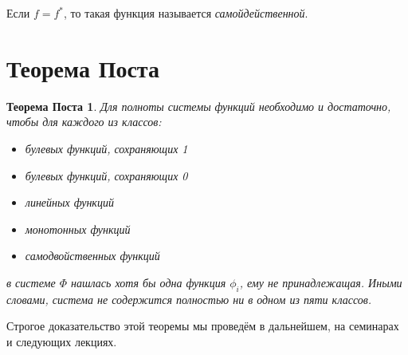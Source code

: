 ﻿\documentclass[a4paper, 12pt]{article}
\newtheorem*{poste}{Теорема Поста}
\begin{document}
Если $f = f^*$, то такая функция называется \textit{самойдейственной}.

\section*{Теорема Поста}
\begin{poste}
Для полноты системы функций необходимо и достаточно, чтобы для каждого из классов:
\begin{itemize}
    \item булевых функций, сохраняющих 1
    \item булевых функций, сохраняющих 0
    \item линейных функций
    \item монотонных функций
    \item самодвойственных функций
\end{itemize}
в системе $\Phi$ нашлась хотя бы одна функция $\phi_i$, ему не принадлежащая. Иными словами, система не содержится полностью ни в одном из пяти классов.
\end{poste}
Строгое доказательство этой теоремы мы проведём в дальнейшем, на семинарах и следующих лекциях.
\end{document}
